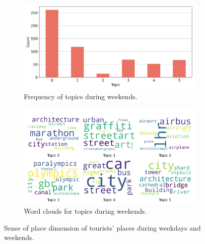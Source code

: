\documentclass{article}
\theoremstyle{definition}
\theoremstyle{remark}
\begin{document}
\begin{figure}[!h]
    \begin{subfigure}{0.45\textwidth}
        \centering
        \includegraphics[width=\linewidth]{figures/places_sense_weekend_tourists.png}
        \caption{Frequency of topics during weekends.}
        \label{fig:places_sense_weekdend_tourists}
    \end{subfigure}
    \hfill
    \begin{subfigure}{0.5\textwidth}
        \centering
        \includegraphics[width=\linewidth]{figures/topics_weekend_tourists.png}
        \caption{Word clouds for topics during weekends.}
        \label{fig:topics_weekend_tourists}
    \end{subfigure}

    \caption{Sense of place dimension of tourists' places during weekdays and weekends.}
    \label{fig:places_topics_sense_tourists_week}
\end{figure}

\end{document}
